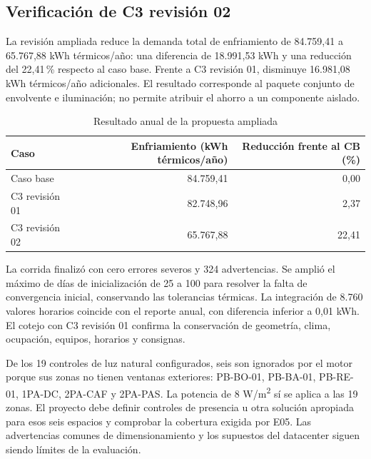 \par\medskip
\subsection{Verificación de C3 revisión 02}
\label{sec:c3r02-resultados}
La revisión ampliada reduce la demanda total de enfriamiento de 84.759,41 a 65.767,88 kWh térmicos/año: una diferencia de 18.991,53 kWh y una reducción del 22,41\,\% respecto al caso base. Frente a C3 revisión 01, disminuye 16.981,08 kWh térmicos/año adicionales. El resultado corresponde al paquete conjunto de envolvente e iluminación; no permite atribuir el ahorro a un componente aislado.
\begin{table}[H]\centering
\caption{Resultado anual de la propuesta ampliada}
{\small\singlespacing\renewcommand{\arraystretch}{1.3}
\begin{tabular}{lrr}\toprule
Caso & Enfriamiento (kWh térmicos/año) & Reducción frente al CB (\%) \\ \midrule
Caso base & 84.759,41 & 0,00 \\
C3 revisión 01 & 82.748,96 & 2,37 \\
C3 revisión 02 & 65.767,88 & 22,41 \\
\bottomrule\end{tabular}}
\end{table}
La corrida finalizó con cero errores severos y 324 advertencias. Se amplió el máximo de días de inicialización de 25 a 100 para resolver la falta de convergencia inicial, conservando las tolerancias térmicas. La integración de 8.760 valores horarios coincide con el reporte anual, con diferencia inferior a 0,01 kWh. El cotejo con C3 revisión 01 confirma la conservación de geometría, clima, ocupación, equipos, horarios y consignas.

De los 19 controles de luz natural configurados, seis son ignorados por el motor porque sus zonas no tienen ventanas exteriores: PB-BO-01, PB-BA-01, PB-RE-01, 1PA-DC, 2PA-CAF y 2PA-PAS. La potencia de 8 W/m\textsuperscript{2} sí se aplica a las 19 zonas. El proyecto debe definir controles de presencia u otra solución apropiada para esos seis espacios y comprobar la cobertura exigida por E05. Las advertencias comunes de dimensionamiento y los supuestos del datacenter siguen siendo límites de la evaluación.

